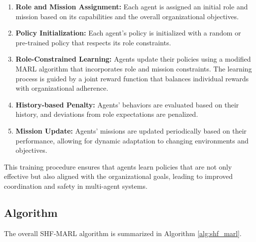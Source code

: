 \documentclass[sigconf,anonymous]{aamas}
\begin{document}
\begin{enumerate}
    \item \textbf{Role and Mission Assignment:} Each agent is assigned an initial role and mission based on its capabilities and the overall organizational objectives.
    \item \textbf{Policy Initialization:} Each agent's policy is initialized with a random or pre-trained policy that respects its role constraints.
    \item \textbf{Role-Constrained Learning:} Agents update their policies using a modified MARL algorithm that incorporates role and mission constraints. The learning process is guided by a joint reward function that balances individual rewards with organizational adherence.
    \item \textbf{History-based Penalty:} Agents' behaviors are evaluated based on their history, and deviations from role expectations are penalized.
    \item \textbf{Mission Update:} Agents' missions are updated periodically based on their performance, allowing for dynamic adaptation to changing environments and objectives.
\end{enumerate}

This training procedure ensures that agents learn policies that are not only effective but also aligned with the organizational goals, leading to improved coordination and safety in multi-agent systems.

\subsection{Algorithm}
The overall SHF-MARL algorithm is summarized in Algorithm \ref{alg:shf_marl}.

\end{document}
